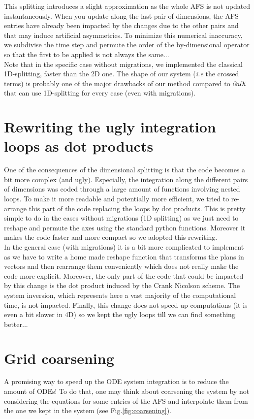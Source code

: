 \documentclass[11pt,a4paper]{article}
\begin{document}
	This splitting introduces a slight approximation as the whole AFS is not updated instantaneously. When you update along the last pair of dimensions, the AFS entries have already been impacted by the changes due to the other pairs and that may induce artificial asymmetries. To minimize this numerical inaccuracy, we subdivise the time step and permute the order of the by-dimensional operator so that the first to be applied is not always the same...\\
	
	Note that in the specific case without migrations, we implemented the classical 1D-splitting, faster than the 2D one. The shape of our system (\textit{i.e} the crossed terms) is probably one of the major drawbacks of our method compared to $\partial a \partial i$ that can use 1D-splitting for every case (even with migrations).

\section{Rewriting the ugly integration loops as dot products}
	One of the consequences of the dimensional splitting is that the code becomes a bit more complex (and ugly). Especially, the integration along the different pairs of dimensions was coded through a large amount of functions involving nested loops. To make it more readable and potentially more efficient, we tried to re-arrange this part of the code replacing the loops by dot products. 
	This is pretty simple to do in the cases without migrations (1D splitting) as we just need to reshape and permute the axes using the standard python functions. Moreover it makes the code faster and more compact so we adopted this rewriting.\\
	In the general case (with migrations) it is a bit more complicated to implement as we have to write a home made reshape function that transforms the plans in vectors and then rearrange them conveniently which does not really make the code more explicit. Moreover, the only part of the code that could be impacted by this change is the dot product induced by the Crank Nicolson scheme. The system inversion, which represents here a vast majority of the computational time, is not impacted. Finally, this change does not speed up computations (it is even a bit slower in 4D) so we kept the ugly loops till we can find something better...

\section{Grid coarsening}
	A promising way to speed up the ODE system integration is to reduce the amount of ODEs! To do that, one may think about coarsening the system by not considering the equations for some entries of the AFS and interpolate them from the one we kept in the system (see Fig.\ref{fig:coarsening}). 
	 
\end{document}

